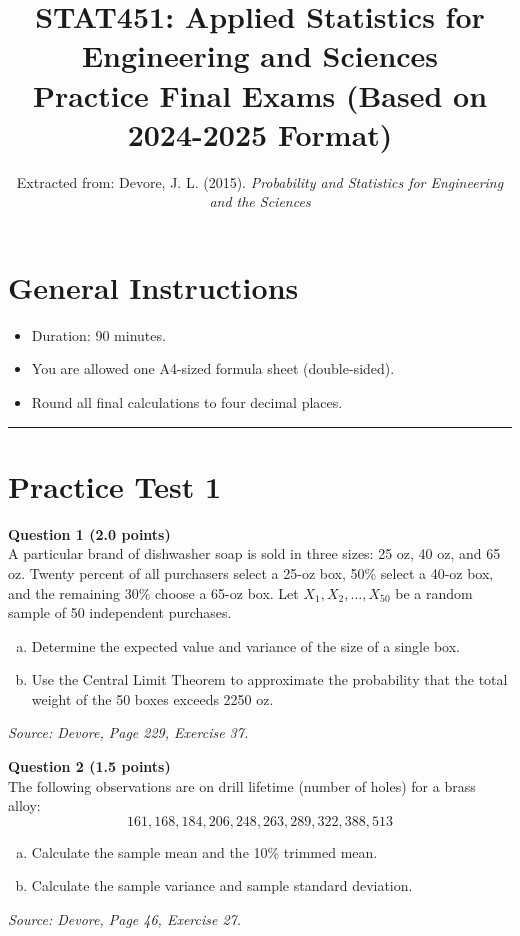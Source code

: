 \documentclass[11pt,a4paper]{article}
\title{STAT451: Applied Statistics for Engineering and Sciences\\Practice Final Exams (Based on 2024-2025 Format)}
\author{Extracted from: Devore, J. L. (2015). \textit{Probability and Statistics for Engineering and the Sciences}}
\date{}
\begin{document}
\maketitle

\section*{General Instructions}
\begin{itemize}
    \item Duration: 90 minutes.
    \item You are allowed one A4-sized formula sheet (double-sided).
    \item Round all final calculations to four decimal places.
\end{itemize}

\hrule
\vspace{1em}

\section*{Practice Test 1}

\noindent \textbf{Question 1 (2.0 points)} \\
A particular brand of dishwasher soap is sold in three sizes: 25 oz, 40 oz, and 65 oz. Twenty percent of all purchasers select a 25-oz box, 50\% select a 40-oz box, and the remaining 30\% choose a 65-oz box. Let $X_1, X_2, \dots, X_{50}$ be a random sample of 50 independent purchases.
\begin{enumerate}[(a)]
    \item Determine the expected value and variance of the size of a single box.
    \item Use the Central Limit Theorem to approximate the probability that the total weight of the 50 boxes exceeds 2250 oz.
\end{enumerate}
\textit{Source: Devore, Page 229, Exercise 37.}

\vspace{1em}
\noindent \textbf{Question 2 (1.5 points)} \\
The following observations are on drill lifetime (number of holes) for a brass alloy:
\[ 161, 168, 184, 206, 248, 263, 289, 322, 388, 513 \]
\begin{enumerate}[(a)]
    \item Calculate the sample mean and the 10\% trimmed mean.
    \item Calculate the sample variance and sample standard deviation.
\end{enumerate}
\textit{Source: Devore, Page 46, Exercise 27.}
\end{document}
